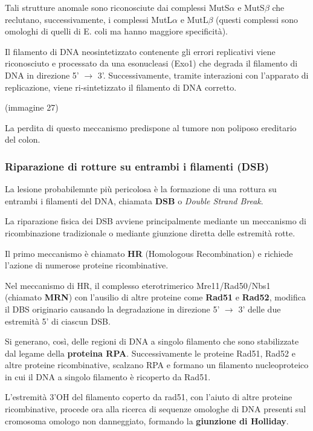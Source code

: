 \documentclass[]{article}
\begin{document}
Tali strutture anomale sono riconosciute dai complessi MutS$\alpha$ e
MutS$\beta$ che reclutano, successivamente, i complessi MutL$\alpha$ e
MutL$\beta$ (questi complessi sono omologhi di quelli di E. coli ma
hanno maggiore specificità).

Il filamento di DNA neosintetizzato contenente gli errori replicativi
viene riconosciuto e processato da una esonucleasi (Exo1) che degrada il
filamento di DNA in direzione 5' $\rightarrow$ 3'. Successivamente,
tramite interazioni con l'apparato di replicazione, viene
ri-sintetizzato il filamento di DNA corretto.

(immagine 27)

La perdita di questo meccanismo predispone al tumore non poliposo
ereditario del colon.

\subsubsection{Riparazione di rotture su entrambi i filamenti
(DSB)}\label{riparazione-di-rotture-su-entrambi-i-filamenti-dsb}

La lesione probabilemnte più pericolosa è la formazione di una rottura
su entrambi i filamenti del DNA, chiamata \textbf{DSB} o \emph{Double
Strand Break}.

La riparazione fisica dei DSB avviene principalmente mediante un
meccanismo di ricombinazione tradizionale o mediante giunzione diretta
delle estremità rotte.

Il primo meccanismo è chiamato \textbf{HR} (Homologous Recombination) e
richiede l'azione di numerose proteine ricombinative.

Nel meccanismo di HR, il complesso eterotrimerico Mre11/Rad50/Nbs1
(chiamato \textbf{MRN}) con l'ausilio di altre proteine come
\textbf{Rad51} e \textbf{Rad52}, modifica il DBS originario causando la
degradazione in direzione 5' $\rightarrow$ 3' delle due estremità 5' di
ciascun DSB.

Si generano, così, delle regioni di DNA a singolo filamento che sono
stabilizzate dal legame della \textbf{proteina RPA}. Successivamente le
proteine Rad51, Rad52 e altre proteine ricombinative, scalzano RPA e
formano un filamento nucleoproteico in cui il DNA a singolo filamento è
ricoperto da Rad51.

L'estremità 3'OH del filamento coperto da rad51, con l'aiuto di altre
proteine ricombinative, procede ora alla ricerca di sequenze omologhe di
DNA presenti sul cromosoma omologo non danneggiato, formando la
\textbf{giunzione di Holliday}.
\end{document}
